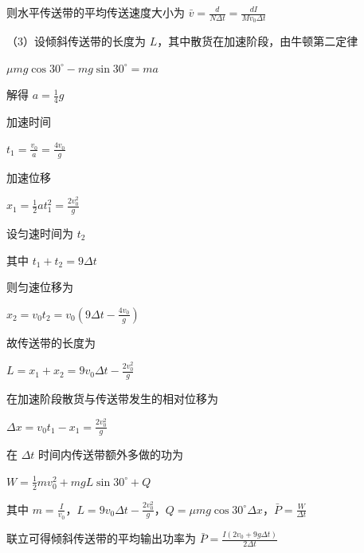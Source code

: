\documentclass[\gkver]{gaokaozhenti}
\begin{document}
\begin{enumerate}
{则水平传送带的平均传送速度大小为 $\bar{v} = \frac{d}{N\Delta t} = \frac{dI}{Mv_{0}\Delta t}$

（3）设倾斜传送带的长度为 $L$，其中散货在加速阶段，由牛顿第二定律

$\mu mg\cos 30^\circ - mg\sin 30^\circ = ma$

解得 $a = \frac{1}{4}g$

加速时间

$t_{1} = \frac{v_{0}}{a} = \frac{4v_{0}}{g}$

加速位移

$x_{1} = \frac{1}{2}at_{1}^{2} = \frac{2v_{0}^{2}}{g}$

设匀速时间为 $t_{2}$

其中 $t_{1} + t_{2} = 9\Delta t$

则匀速位移为

$x_{2} = v_{0}t_{2} = v_{0}\left(9\Delta t - \frac{4v_{0}}{g}\right)$

故传送带的长度为

$L = x_{1} + x_{2} = 9v_{0}\Delta t - \frac{2v_{0}^{2}}{g}$

在加速阶段散货与传送带发生的相对位移为

$\Delta x = v_{0}t_{1} - x_{1} = \frac{2v_{0}^{2}}{g}$

在 $\Delta t$ 时间内传送带额外多做的功为

$W = \frac{1}{2}mv_{0}^{2} + mgL\sin 30^\circ + Q$

其中 $m = \frac{I}{v_{0}}$，$L = 9v_{0}\Delta t - \frac{2v_{0}^{2}}{g}$，$Q = \mu mg\cos 30^\circ\Delta x$，$\bar{P} = \frac{W}{\Delta t}$

联立可得倾斜传送带的平均输出功率为 $\bar{P} = \frac{I(2v_{0} + 9g\Delta t)}{2\Delta t}$
}

\end{enumerate}
\end{document}
